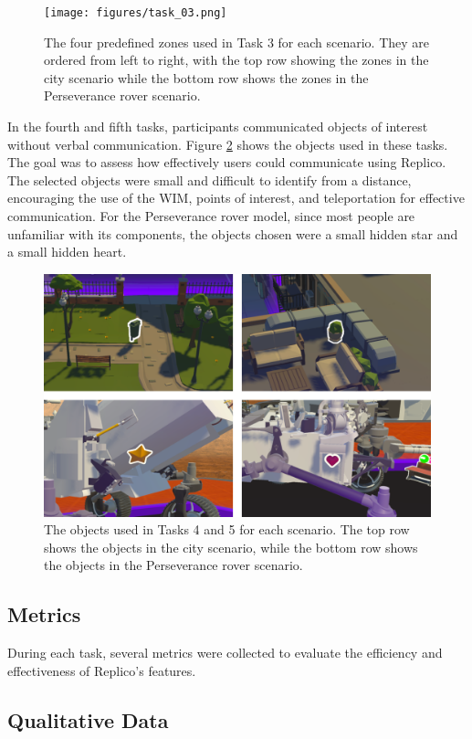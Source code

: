         \begin{figure}[h]
            \centering
            \texttt{[image: figures/task\_03.png]}
            \caption{The four predefined zones used in Task 3 for each scenario. They are ordered from left to right, with the top row showing the zones in the city scenario while the bottom row shows the zones in the Perseverance rover scenario.}
            \label{fig:task_03}
        \end{figure}

        In the fourth and fifth tasks, participants communicated objects of interest without verbal communication. Figure \ref{fig:task_04} shows the objects used in these tasks. The goal was to assess how effectively users could communicate using Replico. The selected objects were small and difficult to identify from a distance, encouraging the use of the WIM, points of interest, and teleportation for effective communication. For the Perseverance rover model, since most people are unfamiliar with its components, the objects chosen were a small hidden star and a small hidden heart.

        \begin{figure}[h]
            \centering
            \includegraphics[width=1\linewidth]{figures/task_04.png}
            \caption{The objects used in Tasks 4 and 5 for each scenario. The top row shows the objects in the city scenario, while the bottom row shows the objects in the Perseverance rover scenario.}
            \label{fig:task_04}
        \end{figure}


    \subsection{Metrics} \label{sec:evaluation_metrics}

        During each task, several metrics were collected to evaluate the efficiency and effectiveness of Replico's features. 

    \subsection{Qualitative Data} \label{sec:qualitative_data}

